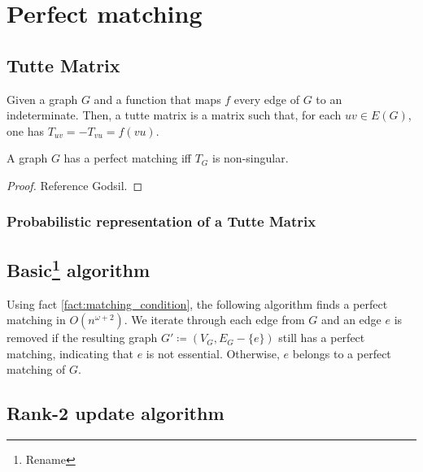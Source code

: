 \chapter{Perfect matching}

\section{Tutte Matrix}

\begin{definition}[Indeterminates]

\end{definition}

\begin{definition}
    Given a graph \(G\) and a function that maps \(f\) every edge of \(G\) to an indeterminate.
    Then, a tutte matrix is a matrix such that, for each \(uv \in E(G)\), one has \(T_{uv} = -T_{vu} = f(vu)\).
\end{definition}

\begin{fact}
    \label{fact:matching_condition}
    A graph \(G\) has a perfect matching iff \(T_G\) is non-singular.
\end{fact}

\begin{proof}
    Reference Godsil.
\end{proof}

\subsection{Probabilistic representation of a Tutte Matrix}

\section{Basic\footnote{Rename} algorithm}

Using fact \ref{fact:matching_condition}, the following algorithm finds a perfect matching in \(O(n^{\omega+2})\).
We iterate through each edge from \(G\) and 
an edge \(e\) is removed if the resulting graph \(G' \coloneqq (V_G, E_G - \{e\})\) still has a perfect matching, indicating that \(e\) is not essential.
Otherwise, \(e\) belongs to a perfect matching of \(G\).

\section{Rank-2 update algorithm}

